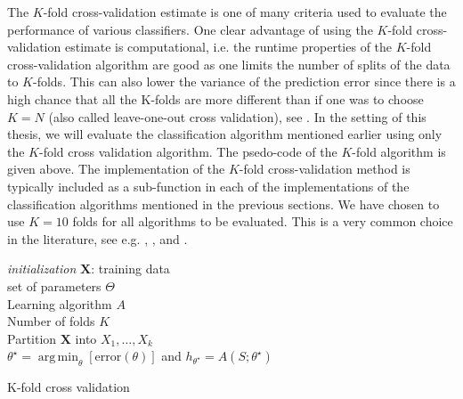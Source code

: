 \documentclass[../thesis.tex]{subfiles}
\begin{document}
\noindent The $K$-fold cross-validation estimate is one of many criteria used to evaluate the performance of various classifiers. One clear advantage of using the $K$-fold cross-validation estimate is computational, i.e. the runtime properties of the $K$-fold cross-validation algorithm are good as one limits the number of splits of the data to $K$-folds. This can also lower the variance of the prediction error since there is a high chance that all the K-folds are more different than if one was to choose $K = N$ (also called leave-one-out cross validation), see \citep{friedman2009elements}. In the setting of this thesis, we will evaluate the classification algorithm mentioned earlier using only the $K$-fold cross validation algorithm. The psedo-code of the $K$-fold algorithm is given above. The implementation of the $K$-fold cross-validation method is typically included as a sub-function in each of the implementations of the classification algorithms mentioned in the previous sections. We have chosen to use $K = 10$ folds for all algorithms to be evaluated. This is a very common choice in the literature, see e.g. \cite{liu2014new}, \cite{alonso2015exploring}, \cite{masetic2016congestive} and \cite{koulaouzidis2016telemonitoring}.

\begin{algorithm}[H]{
\SetAlgoLined
\textit{initialization}\;
    \hspace{0.5cm} $\mathbf{X}$: training data\\
    \hspace{0.5cm} set of parameters $\Theta$\\
    \hspace{0.5cm} Learning algorithm $A$\\
    \hspace{0.5cm} Number of folds $K$\\
    Partition $\mathbf{X}$ into $X_1, \hdots, X_k$\\
    \Return $\theta^\star = \operatorname {arg\,min}_\theta\left[\text{error}(\theta) \right]$ and $h_{\theta^\star} = A \left(S;\theta^\star \right)$\\
}
\caption{K-fold cross validation}
\end{algorithm}
\end{document}
